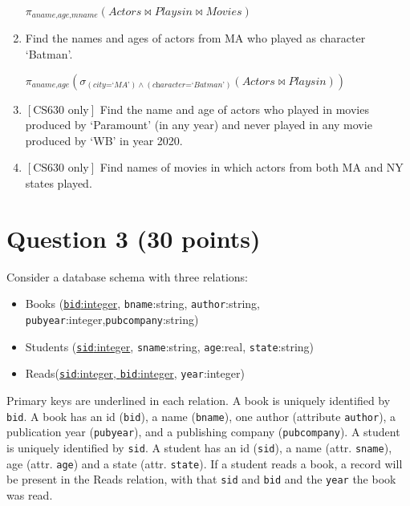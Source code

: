 \documentclass[letterpaper, 11pt]{article}
\begin{document}
\begin{enumerate}[label={\alph*})]
    $\pi_{\textit{aname,age,mname}}(\textit{Actors} \bowtie \textit{Playsin} \bowtie \textit{Movies})$
    
    \item Find the names and ages of actors from MA who played as character `Batman'.

    $\pi_{\textit{aname,age}}(\sigma_{(\textit{city=`MA'})\wedge (\textit{character=`Batman'})}(\textit{Actors} \bowtie \textit{Playsin}))$
    
    \item $\left[\text{CS630 only}\right]$ Find the name and age of actors who played in movies produced by `Paramount' (in any year) and never played in any movie produced by `WB' in year 2020.
    \item $\left[\text{CS630 only}\right]$ Find names of movies in which actors from both MA and NY states played.
\end{enumerate}

\section*{Question 3 (30 points)}

Consider a database schema with three relations:
\begin{itemize}
    \item Books (\underline{\texttt{bid}:integer}, \texttt{bname}:string, \texttt{author}:string, \texttt{pubyear}:integer,\texttt{pubcompany}:string)
    \item Students (\underline{\texttt{sid}:integer}, \texttt{sname}:string, \texttt{age}:real, \texttt{state}:string)
    \item Reads(\underline{\texttt{sid}:integer, \texttt{bid}:integer}, \texttt{year}:integer)
\end{itemize}

Primary keys are underlined  in each relation. A book is uniquely identified by \texttt{bid}. A book has an id (\texttt{bid}), a name (\texttt{bname}), one author (attribute \texttt{author}), a publication year (\texttt{pubyear}), and a publishing company (\texttt{pubcompany}). A student is uniquely identified by \texttt{sid}. A student has an id (\texttt{sid}), a name (attr. \texttt{sname}), age (attr. \texttt{age}) and a state (attr. \texttt{state}). If a student reads a book, a record will be present in the Reads relation, with that \texttt{sid} and \texttt{bid} and the \texttt{year} the book was read.
\end{document}
